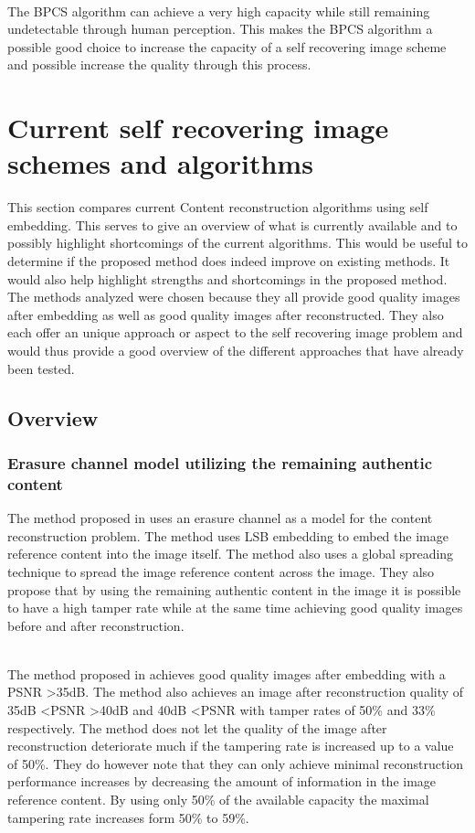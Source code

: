 \documentclass[12pt]{article}
\begin{document}
\hspace{0pt} \\
The BPCS algorithm can achieve a very high capacity while still remaining undetectable through human perception.
This makes the BPCS algorithm a possible good choice to increase the capacity of a self recovering image scheme and possible increase the quality through this process.


\section{Current self recovering image schemes and algorithms}

This section compares current Content reconstruction algorithms using self embedding.
This serves to give an overview of what is currently available and to possibly highlight shortcomings of the current algorithms.
This would be useful to determine if the proposed method does indeed improve on existing methods. 
It would also help highlight strengths and shortcomings in the proposed method.
The methods analyzed were chosen because they all provide good quality images after embedding as well as good quality images after reconstructed.
They also each offer an unique approach or aspect to the self recovering image problem and would thus provide a good overview of the different approaches that have already been tested.

\subsection{Overview}

\subsubsection{Erasure channel model utilizing the remaining authentic content}
\label{ErasureChannelOverview}
The method proposed in \cite {korus2013efficient} uses an erasure channel as a model for the content reconstruction problem.
The method uses LSB embedding to embed the image reference content into the image itself.
The method also uses a global spreading technique to spread the image reference content across the image.
They also propose that by using the remaining authentic content in the image it is possible to have a high tamper rate while at the same time achieving good quality images before and after reconstruction.

\hspace{0pt} \\
The method proposed in \cite {korus2013efficient} achieves good quality images after embedding with a PSNR \textgreater 35dB. 
The method also achieves an image after reconstruction quality of 35dB \textless PSNR \textgreater 40dB and 40dB \textless PSNR with tamper rates of 50\% and 33\% respectively.
The method does not let the quality of the image after reconstruction deteriorate much if the tampering rate is increased up to a value of 50\%.
They do however note that they can only achieve minimal reconstruction performance increases by decreasing the amount of information in the image reference content.
By using only 50\% of the available capacity the maximal tampering rate increases form 50\% to 59\%.
\end{document}
